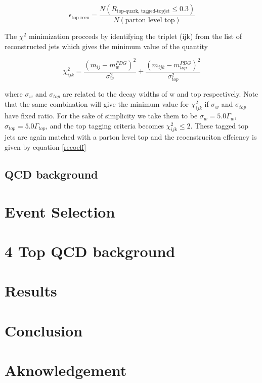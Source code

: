 \documentclass[12pt,a4paper]{article}		%
\begin{document}
	 \begin{equation}
	 \epsilon_{\text{top reco}} = \frac{N(R_{ \text{top-quark,  tagged-topjet}} \le 0.3 )}{N( \text{parton level top})}
	 \label{recoeff}	
	 \end{equation}
	 
The $\chi^2$ minimization procceds by identifying the triplet (ijk) from the list of reconstructed jets which gives the minimum value of the quantity  

	\begin{equation}
		\chi_{ijk}^2 = \frac{ \left(m_{ij} - m_{w}^{PDG} \right)^2 }{ \sigma_w^2}	+  \frac{ \left(m_{ijk} - m_{top}^{PDG} \right)^2 }{ \sigma_{top}^2}
		\label{chisq}
	\end{equation}

where $\sigma_w$ and $\sigma_{top}$ are related to the decay widths of w and top respectively. Note that the same combination will give the minimum value for $\chi_{ijk}^2$ if $\sigma_w$ and $\sigma_{top}$ have fixed ratio. For the sake of simplicity we take them to be $\sigma_w = 5.0\Gamma_w$, $\sigma_{top} = 5.0\Gamma_{top}$, and the top tagging criteria becomes $\chi_{ijk}^2 \le 2$. These tagged top jets are again matched with a parton level top and the reocnstruciton effciency is given by equation \ref{recoeff}     


\subsection{QCD background}

\newpage

\section{Event Selection}
\newpage
\section{4 Top QCD background}
\newpage
\section{Results}
\newpage
\section{Conclusion}
\newpage
\section{Aknowledgement}	 
	\newpage 
\end{document}
